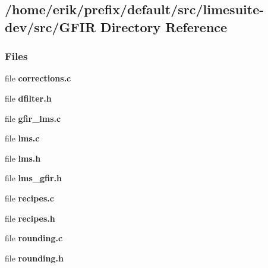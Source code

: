 \subsection{/home/erik/prefix/default/src/limesuite-\/dev/src/\+G\+F\+IR Directory Reference}
\label{dir_1beb40ad52118d7ca09b3286901e8a04}
\subsubsection*{Files}
\begin{DoxyCompactItemize}
\item 
file {\bf corrections.\+c}
\item 
file {\bf dfilter.\+h}
\item 
file {\bf gfir\+\_\+lms.\+c}
\item 
file {\bf lms.\+c}
\item 
file {\bf lms.\+h}
\item 
file {\bf lms\+\_\+gfir.\+h}
\item 
file {\bf recipes.\+c}
\item 
file {\bf recipes.\+h}
\item 
file {\bf rounding.\+c}
\item 
file {\bf rounding.\+h}
\end{DoxyCompactItemize}
